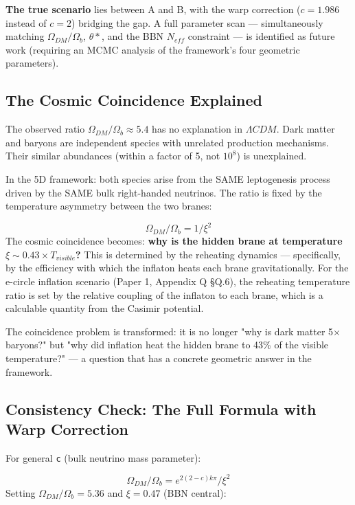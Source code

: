 \documentclass[aps,prd,preprint,superscriptaddress,longbibliography]{revtex4-2}
\begin{document}
\textbf{The true scenario} lies between A and B, with the warp correction ($c = 1.986$ instead of $c = 2$) bridging the gap. A full parameter scan --- simultaneously matching $\Omega_{DM}/\Omega_b$, $\theta*$, and the BBN $N_{eff}$ constraint --- is identified as future work (requiring an MCMC analysis of the framework's four geometric parameters).



\subsection{The Cosmic Coincidence Explained}

The observed ratio $\Omega_{DM}/\Omega_b \approx 5.4$ has no explanation in $\Lambda CDM$. Dark matter and baryons are independent species with unrelated production mechanisms. Their similar abundances (within a factor of 5, not $10^{8}$) is unexplained.

In the 5D framework: both species arise from the SAME leptogenesis process driven by the SAME bulk right-handed neutrinos. The ratio is fixed by the temperature asymmetry between the two branes:


\begin{equation}
    \Omega_{DM} / \Omega_b = 1/\xi^{2}
\end{equation}
The cosmic coincidence becomes: \textbf{why is the hidden brane at temperature $\xi \sim  0.43 \times T_{visible}$?} This is determined by the reheating dynamics --- specifically, by the efficiency with which the inflaton heats each brane gravitationally. For the e-circle inflation scenario (Paper 1, Appendix Q \S{}Q.6), the reheating temperature ratio is set by the relative coupling of the inflaton to each brane, which is a calculable quantity from the Casimir potential.

The coincidence problem is transformed: it is no longer "why is dark matter 5$\times$ baryons?" but "why did inflation heat the hidden brane to 43\% of the visible temperature?" --- a question that has a concrete geometric answer in the framework.



\subsection{Consistency Check: The Full Formula with Warp Correction}

For general \texttt{c} (bulk neutrino mass parameter):


\begin{equation}
    \Omega_{DM} / \Omega_b = e^{2(2-c)k\pi} / \xi^{2}
\end{equation}
Setting $\Omega_{DM}/\Omega_b = 5.36$ and $\xi = 0.47$ (BBN central):
\end{document}

